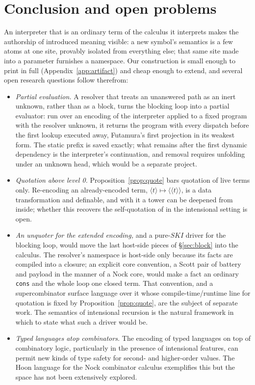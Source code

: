 \documentclass[review]{jfp-epi}
\begin{document}
\section{Conclusion and open problems}\label{sec:open}

An interpreter that is an ordinary term of the calculus it interprets
makes the authorship of introduced meaning visible: a new symbol's semantics is a
few atoms at one site, provably isolated from everything else; that
same site made into a parameter furnishes a namespace. Our construction
is small enough to print in full (Appendix~\ref{app:artifact}) and cheap
enough to extend, and several open research questions follow therefrom:

\begin{itemize}[nosep]
\item \emph{Partial evaluation.} A resolver that treats an unanswered
  path as an inert unknown, rather than as a block, turns the blocking
  loop into a partial evaluator: run over an encoding of the interpreter
  applied to a fixed program with the resolver unknown, it returns the
  program with every dispatch before the first lookup executed away,
  Futamura's first projection in its weakest form. The static prefix is
  saved exactly; what remains after the first dynamic dependency is the
  interpreter's continuation, and removal requires unfolding
  under an unknown head, which would be a separate project.
\item \emph{Quotation above level 0.} Proposition~\ref{prop:quote} bars
  quotation of live terms only. Re-encoding an already-encoded term,
  $\langle t\rangle \mapsto \langle\langle t\rangle\rangle$, is a data
  transformation and definable, and with it a tower can be deepened from
  inside; whether this recovers the self-quotation of
  \citet{Jay2016,Jay2017} in the intensional setting is open.
\item \emph{An unquoter for the extended encoding,} and a pure-$SKI$
  driver for the blocking loop, would move the last host-side pieces of
  \S\ref{sec:block} into the calculus. The resolver's namespace is
  host-side only because its facts are compiled into a closure; an
  explicit core convention, a Scott pair of battery and payload in the
  manner of a Nock core, would make a fact an ordinary \texttt{cons} and
  the whole loop one closed term. That convention, and a supercombinator
  surface language over it whose compile-time/runtime line for quotation
  is fixed by Proposition~\ref{prop:quote}, are the subject of separate
  work. The semantics of intensional recursion \citep{Kavvos2017} is the
  natural framework in which to state what such a driver would be.
\item \emph{Typed languages atop combinators.} The encoding of typed
  languages on top of combinatory logic, particularly in the presence
  of intensional features, can permit new kinds of type safety for
  second- and higher-order values.  The Hoon language for the Nock
  combinator calculus exemplifies this but the space has not been
  extensively explored.
\end{itemize}
\end{document}
